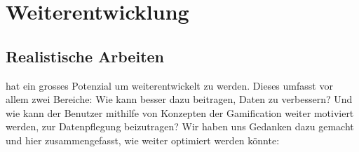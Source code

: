 \chapter{Weiterentwicklung}
\label{pd-weiterentwicklung}

\section{Realistische Arbeiten}
\label{pd-weiterentwicklung-realistisch}

\kort{} hat ein grosses Potenzial um weiterentwickelt zu werden.
Dieses umfasst vor allem zwei Bereiche:
Wie kann \kort{} besser dazu beitragen,  Daten zu verbessern?
Und wie kann der Benutzer mithilfe von Konzepten der Gamification weiter motiviert werden, zur Datenpflegung beizutragen?\newline
Wir haben uns Gedanken dazu gemacht und hier zusammengefasst, wie \kort{} weiter optimiert werden könnte:
